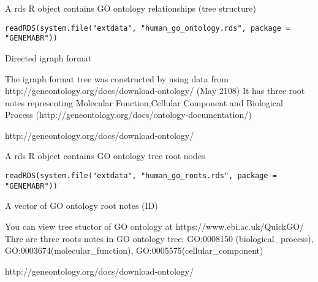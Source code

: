 \documentclass[a4paper]{book}
\begin{document}
%
\begin{Description}\relax
A rds R object contains GO ontology relationships (tree structure)
\end{Description}
%
\begin{Usage}
\begin{verbatim}
readRDS(system.file("extdata", "human_go_ontology.rds", package = "GENEMABR"))
\end{verbatim}
\end{Usage}
%
\begin{Format}
Directed igraph format
\end{Format}
%
\begin{Details}\relax
The igraph format tree was constructed by using data from http://geneontology.org/docs/download-ontology/ (May 2108)
It has three root notes representing Molecular Function,Cellular Component and Biological Process (http://geneontology.org/docs/ontology-documentation/)
\end{Details}
%
\begin{Source}\relax
http://geneontology.org/docs/download-ontology/
\end{Source}
%
\begin{Description}\relax
A rds R object contains GO ontology tree root nodes
\end{Description}
%
\begin{Usage}
\begin{verbatim}
readRDS(system.file("extdata", "human_go_roots.rds", package = "GENEMABR"))
\end{verbatim}
\end{Usage}
%
\begin{Format}
A vector of GO ontology root notes (ID)
\end{Format}
%
\begin{Details}\relax
You can view tree stuctor of GO ontology at  https://www.ebi.ac.uk/QuickGO/
Thre are three roots notes in GO ontology tree: GO:0008150 (biological\_process), GO:0003674(molecular\_function), GO:0005575(cellular\_component)
\end{Details}
%
\begin{Source}\relax
http://geneontology.org/docs/download-ontology/
\end{Source}
\end{document}
